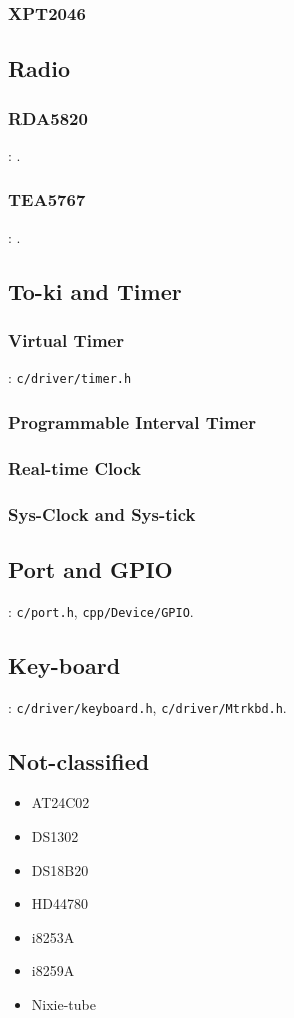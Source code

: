 \subsubsection{XPT2046}

\subsection{Radio}

\subsubsection{RDA5820}

: .

\subsubsection{TEA5767}

: .

\subsection{To-ki and Timer}
\subsubsection{Virtual Timer}
: \verb`c/driver/timer.h`

\subsubsection{Programmable Interval Timer}
\subsubsection{Real-time Clock}
\subsubsection{Sys-Clock and Sys-tick}

\subsection{Port and GPIO}
: \verb`c/port.h`, \verb`cpp/Device/GPIO`.


\subsection{Key-board}
: \verb`c/driver/keyboard.h`, \verb`c/driver/Mtrkbd.h`.

\subsection{Not-classified}
\begin{itemize}
\item AT24C02
\item DS1302
\item DS18B20
\item HD44780
\item i8253A
\item i8259A
\item Nixie-tube
\end{itemize}


